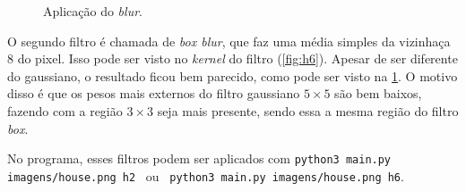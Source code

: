 \begin{figure}[H]
    \caption{Aplicação do \textit{blur}.}
    \label{fig:blur}
\end{figure}

O segundo filtro é chamada de \textit{box blur}, que faz uma média simples da vizinhaça 8 do pixel. Isso pode ser visto no \textit{kernel} do filtro (\cref{fig:h6}). Apesar de ser diferente do gaussiano, o resultado ficou bem parecido, como pode ser visto na \cref{fig:blur}. O motivo disso é que os pesos mais externos do filtro gaussiano $5 \times 5$ são bem baixos, fazendo com a região $3 \times 3$ seja mais presente, sendo essa a mesma região do filtro \textit{box}.

No programa, esses filtros podem ser aplicados com \texttt{python3 main.py imagens/house.png h2} ~ou~ \texttt{python3 main.py imagens/house.png h6}.
